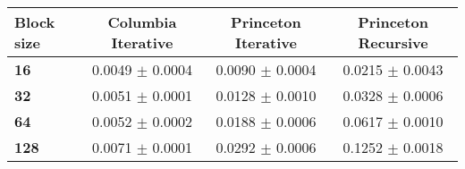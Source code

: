 \begin{tabular}{lccc}\toprule
\textbf{Block size}  & \textbf{Columbia Iterative} & \textbf{Princeton Iterative} & \textbf{Princeton Recursive}\\\midrule
\textbf{16}  & 0.0049 $\pm$ 0.0004 & 0.0090 $\pm$ 0.0004 & 0.0215 $\pm$ 0.0043\\
\textbf{32}  & 0.0051 $\pm$ 0.0001 & 0.0128 $\pm$ 0.0010 & 0.0328 $\pm$ 0.0006\\
\textbf{64}  & 0.0052 $\pm$ 0.0002 & 0.0188 $\pm$ 0.0006 & 0.0617 $\pm$ 0.0010\\
\textbf{128} & 0.0071 $\pm$ 0.0001 & 0.0292 $\pm$ 0.0006 & 0.1252 $\pm$ 0.0018\\
\bottomrule
\end{tabular}
